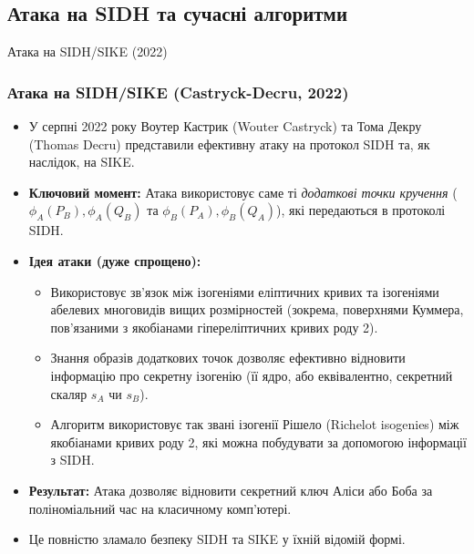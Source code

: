 \documentclass[9pt]{beamer}
\begin{document}
\begin{darkframes}
\section{Атака на SIDH та сучасні алгоритми}

\begin{frame}{Атака на SIDH/SIKE (2022)}
  \frametitle{Атака на SIDH/SIKE (Castryck-Decru, 2022)}
  \begin{itemize}
    \item У серпні 2022 року Воутер Кастрик (Wouter Castryck) та Тома Декру (Thomas Decru) представили ефективну атаку на протокол SIDH та, як наслідок, на SIKE.
    \item \textbf{Ключовий момент:} Атака використовує саме ті \textit{додаткові точки кручення} ($\phi_A(P_B), \phi_A(Q_B)$ та $\phi_B(P_A), \phi_B(Q_A)$), які передаються в протоколі SIDH.
    \item \textbf{Ідея атаки (дуже спрощено):}
      \begin{itemize}
        \item Використовує зв'язок між ізогеніями еліптичних кривих та ізогеніями абелевих многовидів вищих розмірностей (зокрема, поверхнями Куммера, пов'язаними з якобіанами гіпереліптичних кривих роду 2).
        \item Знання образів додаткових точок дозволяє ефективно відновити інформацію про секретну ізогенію (її ядро, або еквівалентно, секретний скаляр $s_A$ чи $s_B$).
        \item Алгоритм використовує так звані ізогенії Рішело (Richelot isogenies) між якобіанами кривих роду 2, які можна побудувати за допомогою інформації з SIDH.
      \end{itemize}
    \item \textbf{Результат:} Атака дозволяє відновити секретний ключ Аліси або Боба за поліноміальний час на класичному комп'ютері.
    \item Це повністю зламало безпеку SIDH та SIKE у їхній відомій формі.
  \end{itemize}
\end{frame}



\end{darkframes}
\end{document}
